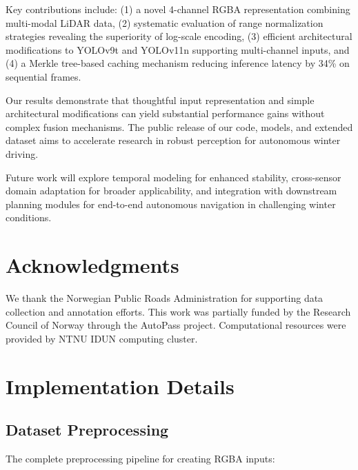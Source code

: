 Key contributions include: (1) a novel 4-channel RGBA representation combining multi-modal LiDAR data, (2) systematic evaluation of range normalization strategies revealing the superiority of log-scale encoding, (3) efficient architectural modifications to YOLOv9t and YOLOv11n supporting multi-channel inputs, and (4) a Merkle tree-based caching mechanism reducing inference latency by 34\% on sequential frames.

Our results demonstrate that thoughtful input representation and simple architectural modifications can yield substantial performance gains without complex fusion mechanisms. The public release of our code, models, and extended dataset aims to accelerate research in robust perception for autonomous winter driving.

Future work will explore temporal modeling for enhanced stability, cross-sensor domain adaptation for broader applicability, and integration with downstream planning modules for end-to-end autonomous navigation in challenging winter conditions.

\section*{Acknowledgments}

We thank the Norwegian Public Roads Administration for supporting data collection and annotation efforts. This work was partially funded by the Research Council of Norway through the AutoPass project. Computational resources were provided by NTNU IDUN computing cluster.




\appendix

\section{Implementation Details}

\subsection{Dataset Preprocessing}

The complete preprocessing pipeline for creating RGBA inputs:

